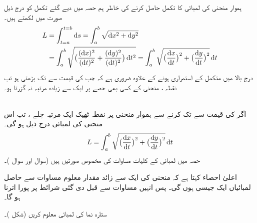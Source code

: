  ہموار منحنی  کی لمبائی کا تکمل حاصل کرنے کی خاطر ہم حصہ  میں دیے گئے   تکمل   کو درج ذیل صورت میں لکھتے ہیں۔ 
\begin{align*}
L&=\int_{t=a}^{t=b}\dif s=\int_a^b\sqrt{\dif x^2+\dif y^2}\\
&=\int_a^b\sqrt{\big(\frac{(\dif x)^2}{(\dif t)^2}+\frac{(\dif y)^2}{(\dif t)^2}\big)\dif t^2}=\int_a^b\sqrt{\big(\frac{\dif x}{\dif t}\big)^2+\big(\frac{\dif y}{\dif t}\big)^2}\dif t
\end{align*}
درج بالا  میں متکمل  کے  استمراری ہونے کے علاوہ ضروری ہے کہ جب  کی قیمت  سے  تک بڑھتی ہو تب نقطہ ، منحنی کے کسی بھی حصے  پر ایک سے زیادہ مرتبہ نہ گزرتا ہو۔

\\
اگر  کی قیمت   سے    تک کرنے سے ہموار منحنی  پر  نقطہ ٹھیک ایک مرتبہ چلے ، تب اس منحنی کی لمبائی درج ذیل ہو گی۔
\begin{align}\label{مساوات_مخروط_لمبائی_منحنی}
L=\int_a^b\sqrt{\big(\frac{\dif x}{\dif t}\big)^2+\big(\frac{\dif y}{\dif t}\big)^2}\dif t
\end{align}  
حصہ  میں لمبائی کے کلیات مساوات  کی مخصوص صورتیں ہیں (سوال  اور سوال )۔

اعلیٰ احصاء کہتا ہے کہ منحنی کی ایک سے زائد مقدار معلوم مساوات سے حاصل لمبائیاں ایک  جیسی ہوں گی۔ پس انہیں مساوات  سے قبل دی گئی شرائط پر پورا اترنا ہو گا۔

ستارہ نما  کی لمبائی معلوم کریں (شکل )۔


